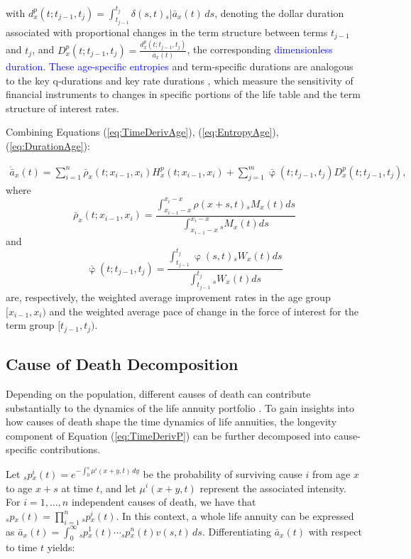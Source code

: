 \documentclass[12pt]{article}
\newcommand{\revision}[1]{\textcolor{blue}{#1}}
\begin{document}
with ${d}^{p}_{x}(t;t_{j-1},t_{j}) = \int_{t_{j-1}}^{t_j} \delta(s,t) {}_s|\bar{a}_x(t) \, ds$, denoting the dollar duration associated with proportional changes in the term structure between terms $t_{j-1}$ and $t_{j}$, and ${D}^{p}_{x}(t;t_{j-1},t_{j}) = \frac{{d}^{p}_{x}(t;t_{j-1},t_{j})}{\bar{a}_x(t)}$, the corresponding \revision{dimensionless duration. These age-specific entropies} and term-specific durations are analogous to the key q-durations \citep{li2012key} and key rate durations \citep{Ho1992}, which measure the sensitivity of financial instruments to changes in specific portions of the life table and the term structure of interest rates.



Combining Equations (\ref{eq:TimeDerivAge}), (\ref{eq:EntropyAge}), (\ref{eq:DurationAge}):  

\begin{equation}\label{eq:TimeDerivAge2}
\begin{split}
 \acute{\bar{a}}_x(t) = \sum_{i=1}^n\bar{\rho}_x(t;x_{i-1}, x_i){H}^{p}_x(t;x_{i-1}, x_i) +\sum_{j=1}^m\bar{\upvarphi}(t;t_{j-1},t_{j}){D}^{p}_x(t;t_{j-1},t_{j}),  
\end{split}
\end{equation}
where $$\bar{\rho}_x(t;x_{i-1}, x_i)= \frac{\int_{x_{i-1}-x}^{x_i-x} \rho(x+s,t) {}_sM_x(t)  ds}{\int_{x_{i-1}-x}^{x_i-x}  {}_sM_x(t)ds}$$ and 
$$\bar{\upvarphi}(t;t_{j-1},t_{j})= \frac{\int_{t_{j-1}}^{t_{j}} \upvarphi(s,t) {}_sW_x(t)  ds}{\int_{t_{j-1}}^{t_{j}} {}_sW_x(t) ds}$$ are, respectively, the weighted average improvement rates in the age group $[x_{i-1},x_{i})$ and the weighted average pace of change in the force of interest for the term group $[t_{j-1},t_{j})$. 





\subsection{Cause of Death Decomposition}


Depending on the population, different causes of death can contribute substantially to the dynamics of the life annuity portfolio \citep{lin2005securitization,kallestrup2020insight}. To gain insights into how causes of death shape the time dynamics of life annuities, the longevity component of Equation (\ref{eq:TimeDerivP}) can be further decomposed into cause-specific contributions.

Let ${_s}p{^i_x}(t) = e^{-\int_{0}^{s} \mu{^i}(x+y,t) \, dy}$ be the probability of surviving cause $i$ from age \(x\) to age \(x+s\) at time $t$, and let $\mu{^i}(x+y,t)$ represent the associated intensity. For $i = 1, \dots, n$ independent causes of death, we have that ${_s}p{_x}(t) = \prod_{i=1}^{n} {_s}p{^i_x}(t)$. In this context, a whole life annuity can be expressed as $\bar{a}_x(t) = \int_0^\infty {_s}p{^1_x}(t) \cdots {_s}p{^n_x}(t) {v}(s,t)\, ds.$ Differentiating $\bar{a}_x(t)$ with respect to time $t$ yields:
\end{document}

